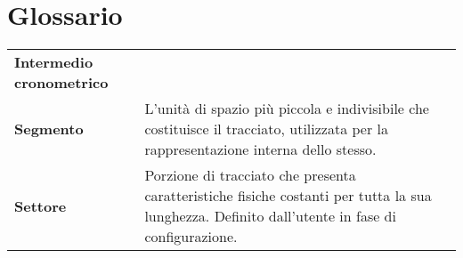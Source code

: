 \documentclass[11pt,a4paper]{report}
\newcommand{\term}[2]{\textbf{#1} & #2 \\}
\begin{document}
\appendix

\chapter{Glossario}

\begin{tabularx}{\textwidth}{lX}
\term{Intermedio cronometrico}{}
\term{Segmento}{L'unità di spazio più piccola e indivisibile che costituisce il tracciato, utilizzata per la rappresentazione interna dello stesso.}
\term{Settore}{Porzione di tracciato che presenta caratteristiche fisiche costanti per tutta la sua lunghezza. Definito dall'utente in fase di configurazione.}
\end{tabularx}
\end{document}
